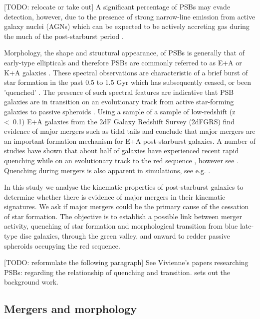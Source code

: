 [TODO: relocate or take out] A significant percentage of PSBs may evade detection, however, due to the presence of strong narrow-line emission from active galaxy nuclei (AGNs) which can be expected to be actively accreting gas during the much of the post-starburst period \citep{2018MNRAS.477.1708P}. 

Morphology, the shape and structural appearance, of PSBs is generally that of early-type ellipticals and therefore PSBs are commonly referred to as E+A or K+A galaxies \citep{1983ApJ...270....7D,1996ApJ...466..104Z,2009ARA&A..47..159B}. These spectral observations are characteristic of a brief burst of star formation in the past 0.5 to 1.5 Gyr which has subsequently ceased, or been 'quenched' \citep{1983ApJ...270....7D,1987MNRAS.229..423C,1997A&A...325.1025P}. The presence of such spectral features are indicative that PSB galaxies are in transition on an evolutionary track from active star-forming galaxies to passive spheroids \citep{2004MNRAS.355..713B,2012MNRAS.420..672S,2013MNRAS.429.2212M}. Using a sample of a sample of low-redshift (z \textless\ 0.1) E+A galaxies from the 2dF Galaxy Redshift Survey (2dFGRS) \citet{2004MNRAS.355..713B} find evidence of major mergers such as tidal tails and conclude that major mergers are an important formation mechanism for E+A post-starburst galaxies. A number of studies have shown that about half of galaxies have experienced recent rapid quenching while on an evolutionary track to the red sequence \citep{Martin_2007,10.1111/j.1365-2966.2009.14537.x,2015MNRAS.450..435S}, however see \cite{2017ApJ...845..145W}. Quenching during mergers is also apparent in simulations, see e.g. \cite{2019MNRAS.484.2447D,2019NatAs...3..440P}.

In this study we analyse the kinematic properties of post-starburst galaxies to determine whether there is evidence of major mergers in their kinematic signatures. We ask if major mergers could be the primary cause of the cessation of star formation. The objective is to establish a possible link between merger activity, quenching of star formation and morphological transition from blue late-type disc galaxies, through the green valley, and onward to redder passive spheroids occupying the red sequence.

[TODO: reformulate the following paragraph] See Vivienne's  papers researching PSBs: \citet{2017MNRAS.472.1401A} regarding the relationship of quenching and transition. \citet{2016MNRAS.463..832W} sets out the background work.

\subsection{Mergers and morphology}
\label{sec:mergers}

